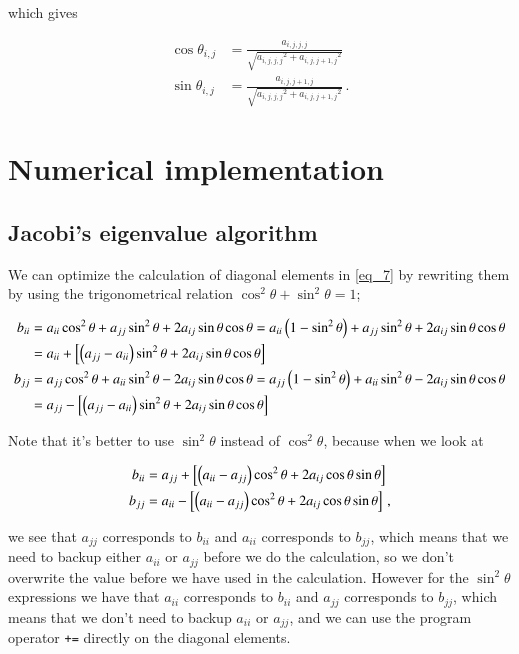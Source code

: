 \documentclass[11pt,english,a4paper]{article}
\begin{document}
\begin{flushleft}
which gives

\begin{align*}
\cos\theta_{i,j} &= \frac{a_{i,j,j,j}}{\sqrt{{a_{i,j,j,j}}^2+{a_{i,j,j+1,j}}^2}}
\\
\sin\theta_{i,j} &= \frac{a_{i,j,j+1,j}}{\sqrt{{a_{i,j,j,j}}^2+{a_{i,j,j+1,j}}^2}} \,.
\end{align*}

\section{Numerical implementation}

\subsection{Jacobi's eigenvalue algorithm}

We can optimize the calculation of diagonal elements in \eqref{eq_7} by rewriting them by using the trigonometrical relation $\cos^2\theta+\sin^2\theta = 1$;

\begin{align}
b_{ii} &= a_{ii}\cos^2\theta + a_{jj}\sin^2\theta + 2 a_{ij}\sin\theta\cos\theta 
= a_{ii}\left({1-\sin^2\theta}\right) + a_{jj}\sin^2\theta + 2 a_{ij}\sin\theta\cos\theta
\nonumber\\
&= a_{ii} + \left[{\left({a_{jj}-a_{ii}}\right)\sin^2\theta + 2 a_{ij}\sin\theta\cos\theta}\right]
\\
b_{jj} &= a_{jj}\cos^2\theta + a_{ii}\sin^2\theta - 2a_{ij}\sin\theta\cos\theta
= a_{jj}\left({1-\sin^2\theta}\right) + a_{ii}\sin^2\theta - 2a_{ij}\sin\theta\cos\theta
\nonumber\\
&= a_{jj} - \left[{\left({a_{jj}-a_{ii}}\right)\sin^2\theta + 2a_{ij}\sin\theta\cos\theta}\right]
\end{align}

Note that it's better to use $\sin^2\theta$ instead of $\cos^2\theta$, because when we look at 

\begin{align*}
b_{ii} &= a_{jj} + \left[{\left({a_{ii}-a_{jj}}\right)\cos^2\theta + 2a_{ij}\cos\theta\sin\theta}\right]
\\
b_{jj} &= a_{ii} - \left[{\left({a_{ii}-a_{jj}}\right)\cos^2\theta + 2a_{ij}\cos\theta\sin\theta}\right] \,,
\end{align*}

we see that $a_{jj}$ corresponds to $b_{ii}$ and $a_{ii}$ corresponds to $b_{jj}$, which means that we need to backup either $a_{ii}$ or $a_{jj}$ before we do the calculation, so we don't overwrite the value before we have used in the calculation. However for the $\sin^2\theta$ expressions we have that $a_{ii}$ corresponds to $b_{ii}$ and $a_{jj}$ corresponds to $b_{jj}$, which means that we don't need to backup $a_{ii}$ or $a_{jj}$, and we can  use the program operator \texttt{+=} directly on the diagonal elements. 


\end{flushleft}
\end{document}
